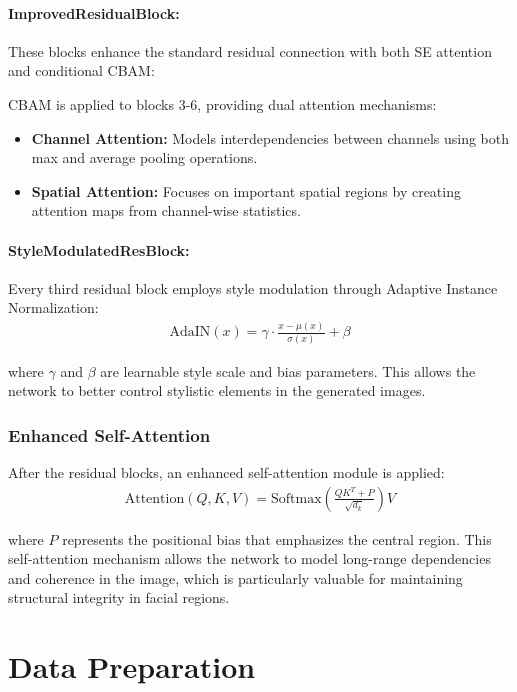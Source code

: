 \documentclass[twoside,english,notitlepage]{report}
\begin{document}
\paragraph{ImprovedResidualBlock:} These blocks enhance the standard residual connection with both SE attention and conditional CBAM:

CBAM is applied to blocks 3-6, providing dual attention mechanisms:
\begin{itemize}
    \item \textbf{Channel Attention:} Models interdependencies between channels using both max and average pooling operations.
    \item \textbf{Spatial Attention:} Focuses on important spatial regions by creating attention maps from channel-wise statistics.
\end{itemize}

\paragraph{StyleModulatedResBlock:} Every third residual block employs style modulation through Adaptive Instance Normalization:
\begin{align}
    \text{AdaIN}(x) = \gamma \cdot \frac{x - \mu(x)}{\sigma(x)} + \beta
\end{align}

where $\gamma$ and $\beta$ are learnable style scale and bias parameters. This allows the network to better control stylistic elements in the generated images.

\subsubsection{Enhanced Self-Attention}
After the residual blocks, an enhanced self-attention module is applied:
\begin{align}
    \text{Attention}(Q, K, V) = \text{Softmax}\left(\frac{QK^T + P}{\sqrt{d_k}}\right)V
\end{align}

where $P$ represents the positional bias that emphasizes the central region. This self-attention mechanism allows the network to model long-range dependencies and coherence in the image, which is particularly valuable for maintaining structural integrity in facial regions.


\section{Data Preparation}
\end{document}

